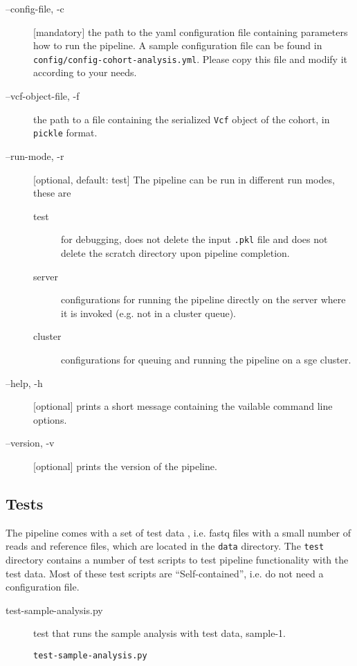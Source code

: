 \documentclass[a4paper]{article}
\begin{document}
\begin{description}
\item[--config-file, -c] [mandatory] the path to the yaml configuration
  file containing parameters how to run the pipeline. A sample
  configuration file can be found in
  \texttt{config/config-cohort-analysis.yml}. Please copy this file and
  modify it according to your needs.
\item[--vcf-object-file, -f] the path to a file containing the
  serialized \texttt{Vcf} object of the cohort, in \texttt{pickle}
  format.
\item[--run-mode, -r] [optional, default: test] The pipeline can be
  run in different run modes, these are 

  \begin{description}
  \item[test] for debugging, does not delete the input \texttt{.pkl}
    file and does not delete the scratch directory upon pipeline
    completion.
  \item[server] configurations for running the pipeline directly on
    the server where it is invoked (e.g. not in a cluster queue).
  \item[cluster] configurations for queuing and running the pipeline
    on a sge cluster.
  \end{description}
    
\item[--help, -h] [optional] prints a short message containing the
  vailable command line options.

\item[--version, -v] [optional] prints the version of the pipeline.

\end{description}


\subsection{Tests}
\label{sec:tests}

The pipeline comes with a set of test data , i.e. fastq files with a
small number of reads and reference files, which are located in the
\texttt{data} directory. The \texttt{test} directory contains a number
of test scripts to test pipeline functionality with the test
data. Most of these test scripts are ``Self-contained'', i.e. do not
need a configuration file.

\begin{description}
\item[test-sample-analysis.py] test that runs the sample analysis with test data, sample-1.
  \begin{verbatim}
test-sample-analysis.py
\end{verbatim}
\end{description}
\end{document}
